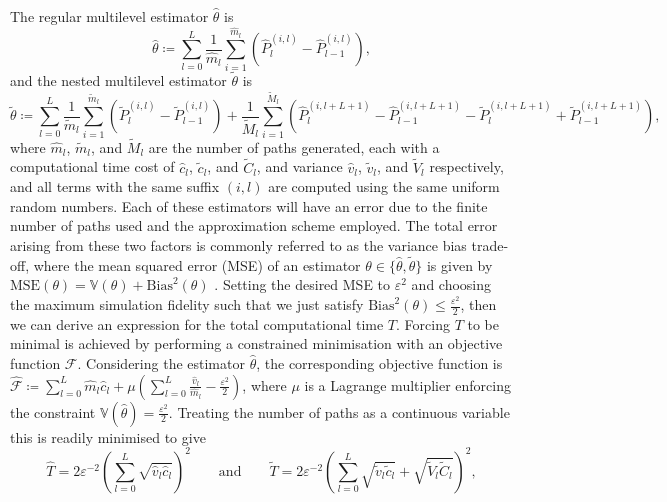 \documentclass[9pt,a4paper,english]{extarticle}
\begin{document}
The regular multilevel estimator $ \hat{\theta} $ is
\begin{equation*}
  \hat{\theta}  \coloneqq \sum_{l=0}^{L} \dfrac{1}{\widehat{m}_l} \sum_{i=1}^{\widehat{m}_l} \left( \widehat{P}^{(i,l)}_l - \widehat{P}^{(i,l)}_{l-1}\right),
\end{equation*}
and the nested multilevel estimator $ \tilde{\theta} $ is
\begin{equation*}
\tilde{\theta} \coloneqq \sum_{l=0}^L \dfrac{1}{\widetilde{m}_l} \sum_{i=1}^{\widetilde{m}_l}\left( \widetilde{P}^{(i,l)}_l - \widetilde{P}^{(i,l)}_{l-1}\right) + \dfrac{1}{\widetilde{M}_l} \sum_{i=1}^{\widetilde{M}_l} \left( \widehat{P}^{(i,l+L+1)}_l - \widehat{P}^{(i,l+L+1)}_{l-1} - \widetilde{P}^{(i,l+L+1)}_l + \widetilde{P}^{(i,l+L+1)}_{l-1}\right),
\end{equation*}
where $ \widehat{m}_l $, $ \widetilde{m}_l $, and $ \widetilde{M}_l $ are the number of paths generated, each with a computational time cost of $ \hat{c}_l $, $ \tilde{c}_l $, and $ \widetilde{C}_l $, and variance $ \hat{v}_l $, $ \tilde{v}_l $, and $ \widetilde{V}_l $ respectively, and all terms with the same suffix $(i,l)$ are computed using the same uniform random numbers. Each of these estimators will have an error due to the finite number of paths used and the approximation scheme employed. The total error arising from these two factors is commonly referred to as the variance bias trade-off, where the mean squared error (MSE) of an estimator $ \theta \in \{\hat{\theta}, \tilde{\theta}\} $ is given by $ \text{MSE}(\theta) = \mathbb{V}(\theta) + \text{Bias}^2(\theta)$ \citep[page~16]{glasserman2013monte}. Setting the desired MSE to $ \varepsilon^2 $ and choosing the maximum simulation fidelity such that we just satisfy $ \text{Bias}^2(\theta) \leq \tfrac{\varepsilon^2}{2} $, then we can derive an expression for the total computational time $ T $. Forcing $ T $ to be minimal is achieved by performing a constrained minimisation with an objective function $ \mathscr{F} $. Considering the estimator $ \hat{\theta} $, the corresponding objective function is $ \widehat{\mathscr{F}} \coloneqq \sum_{l=0}^{L} \widehat{m}_l \hat{c}_l + \mu (\sum_{l=0}^{L} \tfrac{\hat{v}_l}{\widehat{m}_l} - \tfrac{\varepsilon^2}{2}) $, where $ \mu $ is a Lagrange multiplier enforcing the constraint $ \mathbb{V}(\hat{\theta}) = \tfrac{\varepsilon^2}{2} $. Treating the number of paths as a continuous variable this is readily minimised to give
\begin{equation*}
\widehat{T} = 2\varepsilon^{-2}\left(\sum_{l=0}^L \sqrt{\hat{v}_l \hat{c}_l}\right)^2 
\qquad \text{and} \qquad 
\widetilde{T} = 2\varepsilon^{-2} \left(\sum_{l=0}^L \sqrt{\tilde{v}_l \tilde{c}_l} + \sqrt{\widetilde{V}_l \widetilde{C}_l}\right)^2,
\end{equation*}
\end{document}
